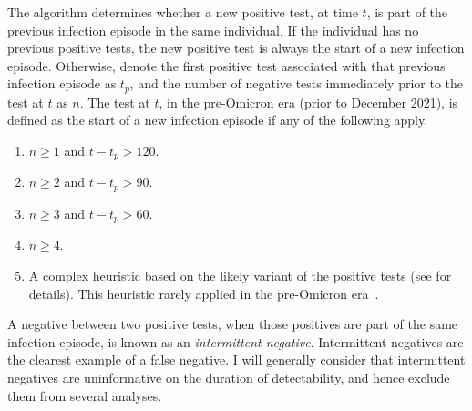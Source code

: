 \documentclass[thesis.tex]{subfiles}
\begin{document}
The algorithm determines whether a new positive test, at time $t$, is part of the previous infection episode in the same individual.
If the individual has no previous positive tests, the new positive test is always the start of a new infection episode.
Otherwise, denote the first positive test associated with that previous infection episode as $t_p$, and the number of negative tests immediately prior to the test at $t$ as $n$.
The test at $t$, in the pre-Omicron era (prior to December 2021), is defined as the start of a new infection episode if any of the following apply.
\begin{enumerate}
  \item $n \geq 1$ and $t - t_p > 120$.
  \item $n \geq 2$ and $t - t_p > 90$.
  \item $n \geq 3$ and $t - t_p > 60$.
  \item $n \geq 4$.
  \item A complex heuristic based on the likely variant of the positive tests (see \textcite{weiRisk} for details). This heuristic rarely applied in the pre-Omicron era~.
\end{enumerate}

A negative between two positive tests, when those positives are part of the same infection episode, is known as an \emph{intermittent negative}.
Intermittent negatives are the clearest example of a false negative.
I will generally consider that intermittent negatives are uninformative on the duration of detectability, and hence exclude them from several analyses.
\end{document}

